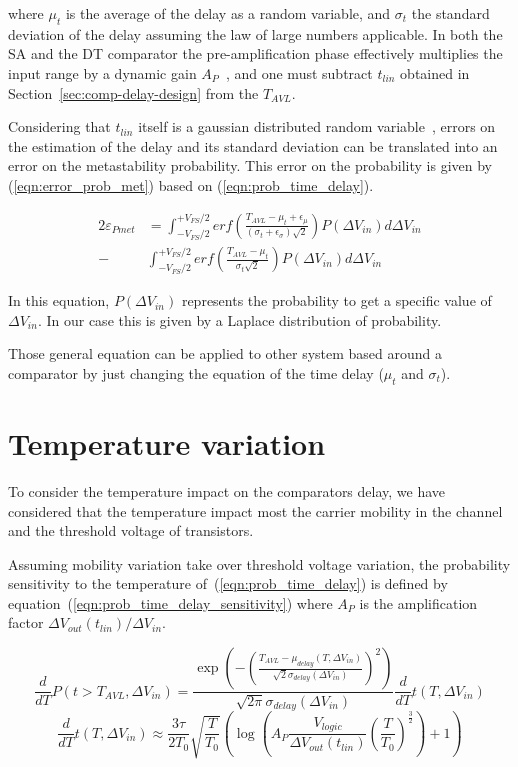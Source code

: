 where $\mu_{t}$ is the average of the delay as a random variable, and $\sigma_{t}$ the standard deviation of the delay assuming the law of large numbers applicable. In both the SA and the DT comparator the pre-amplification phase effectively multiplies the input range by a dynamic gain $A_{P}$~\cite{metastability_figueiredo_2013}, and one must subtract $t_{lin}$ obtained in Section~\ref{sec:comp-delay-design} from the $T_{AVL}$.

Considering that $t_{lin}$  itself is a gaussian distributed random variable~\cite{metastability_figueiredo_2013}, errors on the estimation of the delay and its standard deviation can be translated into an error on the metastability probability. This error on the probability is given by (\ref{eqn:error_prob_met}) based on (\ref{eqn:prob_time_delay}).


\begin{align}
2\varepsilon_{Pmet}& = \int_{-V_{FS}/2}^{+V_{FS}/2}{erf\left(\frac{T_{AVL}-\mu_{t}+\epsilon_{\mu}}{(\sigma_{t}+\epsilon_{\sigma})\sqrt{2}}\right)P(\Delta V_{in})d\Delta V_{in}} \nonumber \\
- &\int_{-V_{FS}/2}^{+V_{FS}/2}{erf\left(\frac{T_{AVL}-\mu_{t}}{\sigma_{t}\sqrt{2}}\right)P(\Delta V_{in})d\Delta V_{in}}
\label{eqn:error_prob_met}
\end{align}

In this equation, $P(\Delta V_{in})$ represents the probability to get a specific value of $\Delta V_{in}$. In our case this is given by a Laplace distribution of probability.

Those general equation can be applied to other system based around a comparator by just changing the equation of the time delay ($\mu_{t}$ and $\sigma_{t}$).

\section{Temperature variation}
To consider the temperature impact on the comparators delay, we have considered that the temperature impact most the carrier mobility in the channel and the threshold voltage of transistors.

Assuming mobility variation take over threshold voltage variation, the probability sensitivity to the temperature of~(\ref{eqn:prob_time_delay}) is defined by equation~(\ref{eqn:prob_time_delay_sensitivity}) where $A_P$ is the amplification factor $\Delta V_{out}(t_{lin}) /\Delta V_{in}$.  

\begin{equation}
\frac{d}{dT}P(t > T_{AVL}, \Delta V_{in}) = 
\frac{\exp\left(-{\left(\frac{T_{AVL}-\mu_{delay}(T, \Delta V_{in})}{\sqrt{2}\sigma_{delay}(\Delta V_{in})}\right)}^2 \right)}{\sqrt{2\pi}\sigma_{delay}(\Delta V_{in})} \frac{d}{dT}t(T, \Delta V_{in})
\label{eqn:prob_time_delay_sensitivity}
\end{equation}
\begin{equation}
\frac{d}{dT}t(T, \Delta V_{in}) \approx 
\frac{3\tau}{2 T_0} \sqrt{\frac{T}{T_0}}\left(\log\left(A_P \frac{V_{logic}}{\Delta V_{out}(t_{lin})} {\left(\frac{T}{T_0}\right)}^\frac{3}{2}\right)+1\right)
\label{eqn:time_delay_sensitivity}
\end{equation}


